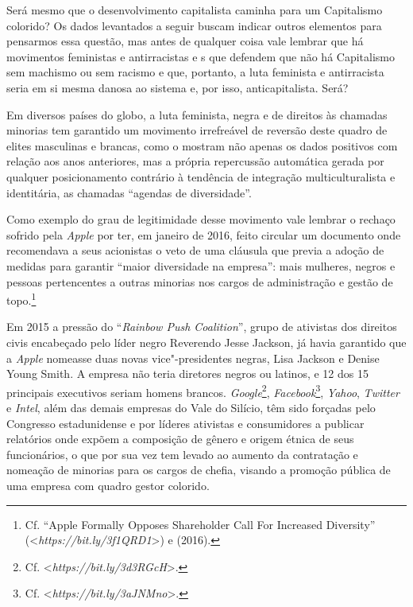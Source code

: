 Será mesmo que o desenvolvimento capitalista caminha para um Capitalismo
colorido? Os dados levantados a seguir buscam indicar outros elementos
para pensarmos essa questão, mas antes de qualquer coisa vale lembrar
que há movimentos feministas e antirracistas e s que defendem que
não há Capitalismo sem machismo ou sem racismo e que, portanto, a luta
feminista e antirracista seria em si mesma danosa ao sistema e, por
isso, anticapitalista. Será?

Em diversos países do globo, a luta feminista, negra e de direitos às
chamadas minorias tem garantido um movimento irrefreável de reversão
deste quadro de elites masculinas e brancas, como o mostram não apenas
os dados positivos com relação aos anos anteriores, mas a própria
repercussão automática gerada por qualquer posicionamento contrário à
tendência de integração multiculturalista e identitária, as chamadas
``agendas de diversidade''.

Como exemplo do grau de legitimidade desse movimento vale lembrar o
rechaço sofrido pela \emph{Apple} por ter, em janeiro de 2016, feito
circular um documento onde recomendava a seus acionistas o veto de uma
cláusula que previa a adoção de medidas para garantir ``maior
diversidade na empresa'': mais mulheres, negros e pessoas pertencentes a
outras minorias nos cargos de administração e gestão de topo.\footnote{Cf.
  ``Apple Formally Opposes Shareholder Call For Increased Diversity''
  (\textless{}\emph{https://bit.ly/3f1QRD1}\textgreater{})
  e  (2016).}

Em 2015 a pressão do ``\emph{Rainbow Push Coalition}'', grupo de
ativistas dos direitos civis encabeçado pelo líder negro Reverendo Jesse
Jackson, já havia garantido que a \emph{Apple} nomeasse duas novas
vice"-presidentes negras, Lisa Jackson e Denise Young Smith. A empresa
não teria diretores negros ou latinos, e 12 dos 15 principais executivos
seriam homens brancos. \emph{Google}\footnote{Cf.
  \textless{}\emph{https://bit.ly/3d3RGcH}\textgreater{}.},
\emph{Facebook}\footnote{Cf.
  \textless{}\emph{https://bit.ly/3aJNMno}\textgreater{}.},
\emph{Yahoo}, \emph{Twitter} e \emph{Intel}, além das demais empresas do
Vale do Silício, têm sido forçadas pelo Congresso estadunidense e por
líderes ativistas e consumidores a publicar relatórios onde expõem a
composição de gênero e origem étnica de seus funcionários, o que por sua
vez tem levado ao aumento da contratação e nomeação de minorias para os
cargos de chefia, visando a promoção pública de uma empresa com quadro
gestor colorido.

